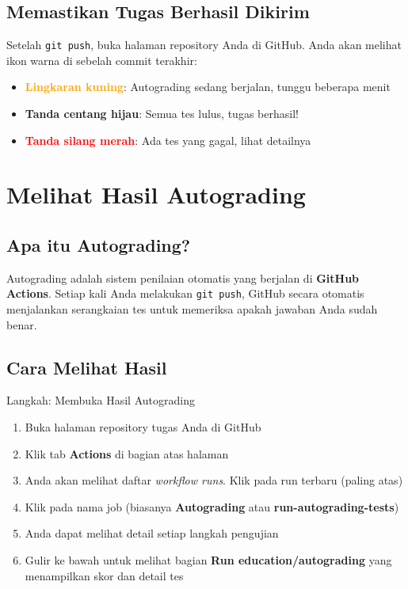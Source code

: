 \documentclass[
    a4paper,
    11pt,
    parskip=half
]{scrartcl}
\begin{document}
\subsection{Memastikan Tugas Berhasil Dikirim}

Setelah \texttt{git push}, buka halaman repository Anda di GitHub. Anda akan melihat ikon warna di sebelah commit terakhir:

\begin{itemize}
    \item \textcolor{orange}{\textbf{Lingkaran kuning}}: Autograding sedang berjalan, tunggu beberapa menit
    \item \textcolor{green!50!black}{\textbf{Tanda centang hijau}}: Semua tes lulus, tugas berhasil!
    \item \textcolor{red}{\textbf{Tanda silang merah}}: Ada tes yang gagal, lihat detailnya
\end{itemize}

\section{Melihat Hasil Autograding}
\label{sec:autograding}

\subsection{Apa itu Autograding?}

Autograding adalah sistem penilaian otomatis yang berjalan di \textbf{GitHub Actions}. Setiap kali Anda melakukan \texttt{git push}, GitHub secara otomatis menjalankan serangkaian tes untuk memeriksa apakah jawaban Anda sudah benar.

\subsection{Cara Melihat Hasil}

\begin{stepbox}{Langkah: Membuka Hasil Autograding}
\begin{enumerate}
    \item Buka halaman repository tugas Anda di GitHub
    \item Klik tab \textbf{Actions} di bagian atas halaman
    \item Anda akan melihat daftar \textit{workflow runs}. Klik pada run terbaru (paling atas)
    \item Klik pada nama job (biasanya \textbf{Autograding} atau \textbf{run-autograding-tests})
    \item Anda dapat melihat detail setiap langkah pengujian
    \item Gulir ke bawah untuk melihat bagian \textbf{Run education/autograding} yang menampilkan skor dan detail tes
\end{enumerate}
\end{stepbox}
\end{document}
